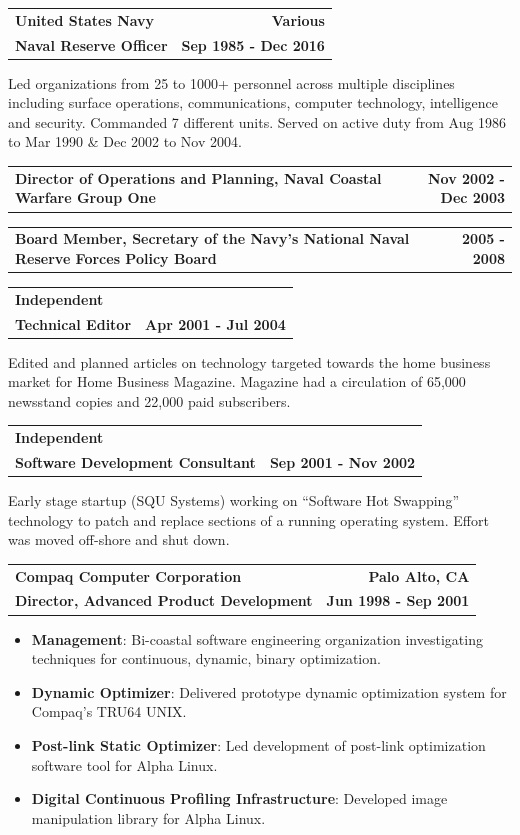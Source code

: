 \documentclass[letterpaper,10pt, sans]{article}
\makeatletter
\newcommand{\resumeCompanyHeading}[4]{
  \vspace{-1pt}
    \item
    \begin{tabular*}{1.0\textwidth}[t]{l@{\extracolsep{\fill}}r}
      \textbf{#1} & \textbf{#2} \\
      \textbf{#3} & \textbf{#4}
    \end{tabular*}\vspace{-1pt}
  }
\newcommand{\resumeCompanyPositionHeading}[2]{
    \vspace{-1pt}
      \item
      \begin{tabular*}{1.0\textwidth}{l@{\extracolsep{\fill}}r}
        \textbf{#1} & \textbf{#2}
    \end{tabular*}\vspace{-1pt}
}
\newcommand{\resumeJobDescription}[1][]{
    \vspace{-1pt}\par{#1}
}
\newcommand{\resumeItem}[2]{\item{{\textbf{#1}}: {#2 \vspace{1pt}}}}
\newcommand{\resumeItemListStart}{\begin{itemize}}\vspace{-1pt}
\newcommand{\resumeItemListEnd}{\end{itemize}}\vspace{-1pt}
\makeatother
\begin{document}
        \resumeCompanyHeading
          {United States Navy}{Various}
          {Naval Reserve Officer}{Sep 1985 - Dec 2016}
          \resumeJobDescription
            {Led organizations from 25 to 1000+ personnel across multiple disciplines including surface operations, communications,
            computer technology, intelligence and security. Commanded 7 different units.
            Served on active duty from Aug 1986 to Mar 1990 \& Dec 2002 to Nov 2004.}

          \resumeCompanyPositionHeading
            {Director of Operations and Planning, Naval Coastal Warfare Group One}
            {Nov 2002 - Dec 2003}

          \resumeCompanyPositionHeading
            {Board Member, Secretary of the Navy's National Naval Reserve Forces Policy Board}
            {2005 - 2008}

        \resumeCompanyHeading
            {Independent}{}
            {Technical Editor}{Apr 2001 - Jul 2004}
            \resumeJobDescription{Edited and planned articles on technology targeted towards the home business market for Home Business Magazine.
              Magazine had a circulation of 65,000 newsstand copies and 22,000 paid subscribers.}

        \resumeCompanyHeading
            {Independent}{}
            {Software Development Consultant}{Sep 2001 - Nov 2002}
            \resumeJobDescription{Early stage startup (SQU Systems) working on ``Software Hot Swapping'' technology to patch and replace sections of a running operating
              system. Effort was moved off-shore and shut down.}

        \resumeCompanyHeading
            {Compaq Computer Corporation}{Palo Alto, CA}
            {Director, Advanced Product Development}{Jun 1998 - Sep 2001}
            \resumeItemListStart
                \resumeItem{Management}{Bi-coastal software engineering organization investigating techniques for continuous, dynamic, binary optimization.}
                \resumeItem{Dynamic Optimizer}{Delivered prototype dynamic optimization system for Compaq's TRU64 UNIX.}
                \resumeItem{Post-link Static Optimizer}{Led development of post-link optimization software tool for Alpha Linux.}
                \resumeItem{Digital Continuous Profiling Infrastructure}{Developed image manipulation library for Alpha Linux.}
            \resumeItemListEnd
\end{document}
